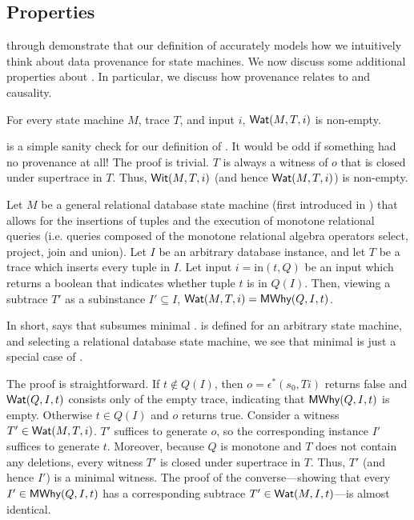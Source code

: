 \subsection{\WatProvenance{} Properties}
 through  demonstrate
that our definition of \watprovenance{} accurately models how we intuitively
think about data provenance for state machines.  We now discuss some additional
properties about \watprovenance{}. In particular, we discuss how
\watprovenance{} provenance relates to \whyprovenance{} and causality.

\begin{claim}
  For every state machine $M$, trace $T$, and input $i$, $\textsf{Wat}(M, T, i)$ is
  non-empty.
\end{claim}

 is a simple sanity check for our definition of
\watprovenance{}. It would be odd if something had no provenance at all! The
proof is trivial. $T$ is always a witness of $o$ that is closed under
supertrace in $T$. Thus, $\textsf{Wit}(M, T, i)$ (and hence $\textsf{Wat}(M, T, i)$) is
non-empty.

\newcommand{\Min}{\text{in}}
\begin{claim}
  Let $M$ be a general relational database state machine (first introduced in
  ) that allows for the insertions of tuples and the
  execution of monotone relational queries (i.e. queries composed of the
  monotone relational algebra operators select, project, join and union). Let
  $I$ be an arbitrary database instance, and let $T$ be a trace which inserts
  every tuple in $I$. Let input $i = \Min(t, Q)$ be an input which returns a
  boolean that indicates whether tuple $t$ is in $Q(I)$.  Then, viewing a
  subtrace $T'$ as a subinstance $I' \subseteq I$, $\textsf{Wat}(M, T, i) = \textsf{MWhy}(Q, I,
  t)$.
\end{claim}

In short,  says that \watprovenance{} subsumes
minimal \whyprovenance{}. \Watprovenance{} is defined for an arbitrary state
machine, and selecting a relational database state machine, we see that minimal
\whyprovenance{} is just a special case of \watprovenance{}.

The proof is straightforward.
%
If $t \notin Q(I)$, then $o = \epsilon^*(s_0, Ti)$ returns false and $\textsf{Wat}(Q,
I, t)$ consists only of the empty trace, indicating that $\textsf{MWhy}(Q, I, t)$ is
empty.
%
Otherwise $t \in Q(I)$ and $o$ returns true. Consider a witness $T' \in \textsf{Wat}(M,
T, i)$. $T'$ suffices to generate $o$, so the corresponding instance $I'$
suffices to generate $t$. Moreover, because $Q$ is monotone and $T$ does not
contain any deletions, every witness $T'$ is closed under supertrace in $T$.
Thus, $T'$ (and hence $I'$) is a minimal witness. The proof of the
converse---showing that every $I' \in \textsf{MWhy}(Q, I, t)$ has a corresponding
subtrace $T' \in \textsf{Wat}(M, I, t)$---is almost identical.

